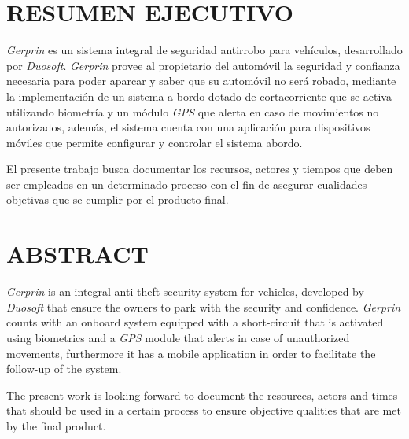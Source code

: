 \section*{RESUMEN EJECUTIVO}

\textit{Gerprin} es un sistema integral de seguridad antirrobo para vehículos, desarrollado por \textit{Duosoft}. \textit{Gerprin} provee al propietario del automóvil la seguridad y confianza necesaria para poder aparcar y saber que su automóvil no será robado, mediante la implementación de un sistema a bordo dotado de cortacorriente que se activa utilizando biometría y un módulo \textit{GPS} que alerta en caso de movimientos no autorizados, además, el sistema cuenta con una aplicación para dispositivos móviles que permite configurar y controlar el sistema abordo.

El presente trabajo busca documentar los recursos, actores y tiempos que deben ser empleados en un determinado proceso con el fin de asegurar cualidades objetivas que se cumplir por el producto final.

\section*{ABSTRACT}

\textit{Gerprin} is an integral anti-theft security system for vehicles, developed by \textit{Duosoft} that ensure the owners to park with the security and confidence. \textit{Gerprin} counts with an onboard system equipped with a short-circuit that is activated using biometrics and a \textit{GPS} module that alerts in case of unauthorized movements, furthermore  it has a mobile application in order to facilitate the follow-up of the system.

The present work is looking forward to document the resources, actors and times that should be used in a certain process to ensure objective qualities that are met by the final product.



